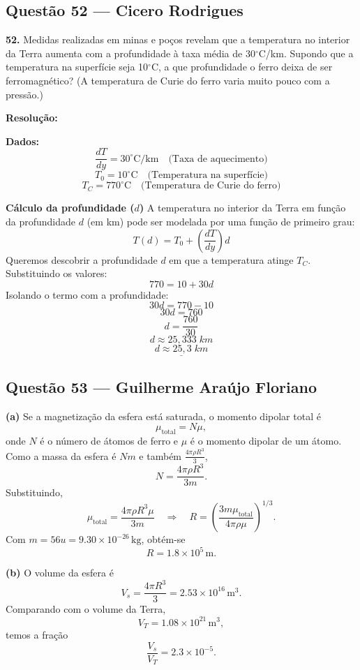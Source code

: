 \documentclass[12pt,a4paper]{article}
\begin{document}
\subsection{Questão 52 — Cicero Rodrigues}

\textbf{52. }\normalfont Medidas realizadas em minas e poços revelam que a temperatura no interior da Terra aumenta com a profundidade à taxa média de 30$^\circ$C/km. Supondo que a temperatura na superfície seja 10$^\circ$C, a que profundidade o ferro deixa de ser ferromagnético? (A temperatura de Curie do ferro varia muito pouco com a pressão.)

\textbf{Resolução:}
\vspace{0.3cm}

\textbf{Dados:}
\[\frac{dT}{dy} = 30^\circ\text{C/km} \quad \text{(Taxa de aquecimento)}\]
\[T_0 = 10^\circ\text{C} \quad \text{(Temperatura na superfície)}\]
\[T_C = 770^\circ\text{C} \quad \text{(Temperatura de Curie do ferro)}\]

\vspace{0.2cm}
\textbf{Cálculo da profundidade (\(d\))}
A temperatura no interior da Terra em função da profundidade \(d\) (em km) pode ser modelada por uma função de primeiro grau:
\[T(d) = T_0 + \left( \frac{dT}{dy} \right) d\]
Queremos descobrir a profundidade \(d\) em que a temperatura atinge \(T_C\). Substituindo os valores:
\[770 = 10 + 30d\]
Isolando o termo com a profundidade:
\[30d = 770 - 10\]
\[30d = 760\]
\[d = \frac{760}{30}\]
\[d \approx 25,333\;km\]
\[\underline{d \approx 25,3\;km}\]

\subsection{Questão 53 — Guilherme Araújo Floriano}

	\textbf{(a)} Se a magnetização da esfera está saturada, o momento dipolar total é
\[
\mu_{\mathrm{total}}=N\mu,
\]
onde $N$ é o número de átomos de ferro e $\mu$ é o momento dipolar de um átomo. Como a massa da esfera é $Nm$ e também $\frac{4\pi\rho R^3}{3}$,
\[
N=\frac{4\pi\rho R^3}{3m}.
\]
Substituindo,
\[
\mu_{\mathrm{total}}=\frac{4\pi\rho R^3\mu}{3m}
\quad\Rightarrow\quad
R=\left(\frac{3m\mu_{\mathrm{total}}}{4\pi\rho\mu}\right)^{1/3}.
\]
Com $m=56u=9.30\times10^{-26}\,\mathrm{kg}$, obtém-se
\[
R=1.8\times10^5\,\mathrm{m}.
\]

	\textbf{(b)} O volume da esfera é
\[
V_s=\frac{4\pi R^3}{3}=2.53\times10^{16}\,\mathrm{m^3}.
\]
Comparando com o volume da Terra,
\[
V_T=1.08\times10^{21}\,\mathrm{m^3},
\]
temos a fração
\[
\frac{V_s}{V_T}=2.3\times10^{-5}.
\]
\end{document}
